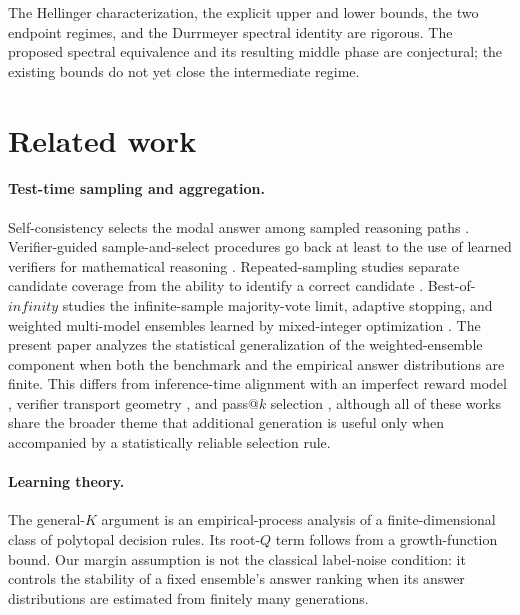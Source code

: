 \documentclass[11pt]{article}
\def\infty{infinity}%
\begin{document}
The Hellinger characterization, the explicit upper and lower bounds, the two endpoint regimes, and the Durrmeyer spectral identity are rigorous.  The proposed spectral equivalence and its resulting middle phase are conjectural; the existing bounds do not yet close the intermediate regime.

\section{Related work}

\paragraph{Test-time sampling and aggregation.}
Self-consistency selects the modal answer among sampled reasoning paths \citep{WangSelfConsistency}.  Verifier-guided sample-and-select procedures go back at least to the use of learned verifiers for mathematical reasoning \citep{CobbeVerifiers}.  Repeated-sampling studies separate candidate coverage from the ability to identify a correct candidate \citep{BrownMonkeys}.  Best-of-$\infty$ studies the infinite-sample majority-vote limit, adaptive stopping, and weighted multi-model ensembles learned by mixed-integer optimization \citep{KomiyamaBoInf}.  The present paper analyzes the statistical generalization of the weighted-ensemble component when both the benchmark and the empirical answer distributions are finite.  This differs from inference-time alignment with an imperfect reward model \citep{HuangBestN}, verifier transport geometry \citep{MukherjeeOT}, and pass@$k$ selection \citep{DiBestMajority}, although all of these works share the broader theme that additional generation is useful only when accompanied by a statistically reliable selection rule.

\paragraph{Learning theory.}
The general-$K$ argument is an empirical-process analysis of a finite-dimensional class of polytopal decision rules.  Its root-$Q$ term follows from a growth-function bound.  Our margin assumption is not the classical label-noise condition: it controls the stability of a fixed ensemble's answer ranking when its answer distributions are estimated from finitely many generations.
\end{document}
